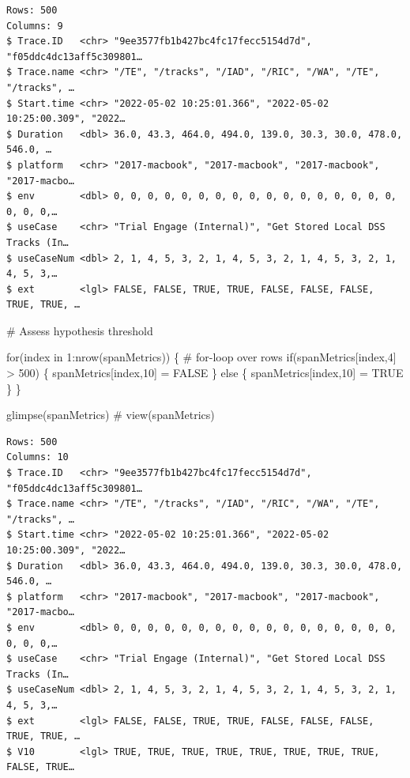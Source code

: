 \documentclass[
  letterpaper,
  DIV=11,
  numbers=noendperiod]{scrartcl}
\newenvironment{Shaded}{\begin{snugshade}}{\end{snugshade}}
\newcommand{\CommentTok}[1]{\textcolor[rgb]{0.37,0.37,0.37}{#1}}
\newcommand{\ConstantTok}[1]{\textcolor[rgb]{0.56,0.35,0.01}{#1}}
\newcommand{\ControlFlowTok}[1]{\textcolor[rgb]{0.00,0.23,0.31}{#1}}
\newcommand{\DecValTok}[1]{\textcolor[rgb]{0.68,0.00,0.00}{#1}}
\newcommand{\FunctionTok}[1]{\textcolor[rgb]{0.28,0.35,0.67}{#1}}
\newcommand{\NormalTok}[1]{\textcolor[rgb]{0.00,0.23,0.31}{#1}}
\newcommand{\OtherTok}[1]{\textcolor[rgb]{0.00,0.23,0.31}{#1}}
\newcommand{\SpecialCharTok}[1]{\textcolor[rgb]{0.37,0.37,0.37}{#1}}
\begin{document}
\begin{verbatim}
Rows: 500
Columns: 9
$ Trace.ID   <chr> "9ee3577fb1b427bc4fc17fecc5154d7d", "f05ddc4dc13aff5c309801…
$ Trace.name <chr> "/TE", "/tracks", "/IAD", "/RIC", "/WA", "/TE", "/tracks", …
$ Start.time <chr> "2022-05-02 10:25:01.366", "2022-05-02 10:25:00.309", "2022…
$ Duration   <dbl> 36.0, 43.3, 464.0, 494.0, 139.0, 30.3, 30.0, 478.0, 546.0, …
$ platform   <chr> "2017-macbook", "2017-macbook", "2017-macbook", "2017-macbo…
$ env        <dbl> 0, 0, 0, 0, 0, 0, 0, 0, 0, 0, 0, 0, 0, 0, 0, 0, 0, 0, 0, 0,…
$ useCase    <chr> "Trial Engage (Internal)", "Get Stored Local DSS Tracks (In…
$ useCaseNum <dbl> 2, 1, 4, 5, 3, 2, 1, 4, 5, 3, 2, 1, 4, 5, 3, 2, 1, 4, 5, 3,…
$ ext        <lgl> FALSE, FALSE, TRUE, TRUE, FALSE, FALSE, FALSE, TRUE, TRUE, …
\end{verbatim}

\begin{Shaded}
\begin{Highlighting}[]
\CommentTok{\# Assess hypothesis threshold}

\ControlFlowTok{for}\NormalTok{(index }\ControlFlowTok{in} \DecValTok{1}\SpecialCharTok{:}\FunctionTok{nrow}\NormalTok{(spanMetrics)) \{       }\CommentTok{\# for{-}loop over rows}
    \ControlFlowTok{if}\NormalTok{(spanMetrics[index,}\DecValTok{4}\NormalTok{] }\SpecialCharTok{\textgreater{}} \DecValTok{500}\NormalTok{) \{}
\NormalTok{        spanMetrics[index,}\DecValTok{10}\NormalTok{] }\OtherTok{=} \ConstantTok{FALSE}
\NormalTok{    \} }\ControlFlowTok{else}\NormalTok{ \{}
\NormalTok{    spanMetrics[index,}\DecValTok{10}\NormalTok{] }\OtherTok{=} \ConstantTok{TRUE}
\NormalTok{    \}}
\NormalTok{\}}
\end{Highlighting}
\end{Shaded}

\begin{Shaded}
\begin{Highlighting}[]
\FunctionTok{glimpse}\NormalTok{(spanMetrics)}
\CommentTok{\# view(spanMetrics)}
\end{Highlighting}
\end{Shaded}

\begin{verbatim}
Rows: 500
Columns: 10
$ Trace.ID   <chr> "9ee3577fb1b427bc4fc17fecc5154d7d", "f05ddc4dc13aff5c309801…
$ Trace.name <chr> "/TE", "/tracks", "/IAD", "/RIC", "/WA", "/TE", "/tracks", …
$ Start.time <chr> "2022-05-02 10:25:01.366", "2022-05-02 10:25:00.309", "2022…
$ Duration   <dbl> 36.0, 43.3, 464.0, 494.0, 139.0, 30.3, 30.0, 478.0, 546.0, …
$ platform   <chr> "2017-macbook", "2017-macbook", "2017-macbook", "2017-macbo…
$ env        <dbl> 0, 0, 0, 0, 0, 0, 0, 0, 0, 0, 0, 0, 0, 0, 0, 0, 0, 0, 0, 0,…
$ useCase    <chr> "Trial Engage (Internal)", "Get Stored Local DSS Tracks (In…
$ useCaseNum <dbl> 2, 1, 4, 5, 3, 2, 1, 4, 5, 3, 2, 1, 4, 5, 3, 2, 1, 4, 5, 3,…
$ ext        <lgl> FALSE, FALSE, TRUE, TRUE, FALSE, FALSE, FALSE, TRUE, TRUE, …
$ V10        <lgl> TRUE, TRUE, TRUE, TRUE, TRUE, TRUE, TRUE, TRUE, FALSE, TRUE…
\end{verbatim}
\end{document}

